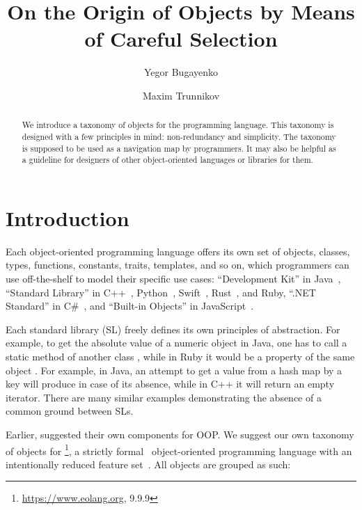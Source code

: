 \documentclass[sigplan,nonacm]{acmart}
\title{On the Origin of Objects by Means of Careful Selection}
\author{Yegor Bugayenko}
\affiliation{
  \institution{Huawei}
  \country{Russia}
  \city{Moscow}
}
\author{Maxim Trunnikov}
\affiliation{
  \institution{Huawei}
  \country{Russia}
  \city{Moscow}
}
\begin{document}
\begin{abstract}
We introduce a taxonomy of objects for the \eolang{} programming language.
This taxonomy is designed with a few principles in mind: non-redundancy and simplicity.
The taxonomy is supposed to be used as a navigation map by \eolang{} programmers.
It may also be helpful as a guideline for designers of other object-oriented languages or libraries for them.
\end{abstract}

\maketitle

\section{Introduction}

Each object-oriented programming language offers its own set of objects, classes, types, functions, constants, traits, templates, and so on, which programmers can use off-the-shelf to model their specific use cases:
``Development Kit'' in Java~\citep{jdk2024,jdk8},
``Standard Library'' in
  C++~\citep{cpp2024,josuttis2012cpp},
  Python~\citep{python2024,hellmann2017python},
  Swift~\citep{swift2024,deitel2015swift},
  Rust~\citep{rust2024,blandy2021rust},
  and
  Ruby,
``.NET Standard'' in C\#~\citep{net2023,abrams2005net},
and ``Built-in Objects'' in JavaScript~\citep{js2024,crockford2008js}.

Each standard library (SL) freely defines its own principles of abstraction.
For example, to get the absolute value of a numeric object  in Java, one has to call a static method of another class , while in Ruby it would be a property of the same object .
For example, in Java, an attempt to get a value from a hash map by a key will produce  in case of its absence, while in C++ it will return an empty iterator.
There are many similar examples demonstrating the absence of a common ground between SLs.

Earlier, \citet{booch1990design} suggested their own components for OOP.
We suggest our own taxonomy of objects for \eolang{}\footnote{%
  \url{https://www.eolang.org}, 9.9.9},
a strictly formal~\citep{kudasov2022formalizing} object-oriented programming language with an intentionally reduced feature set~\citep{bugayenko2021eolang}.
All objects are grouped as such:
\end{document}

